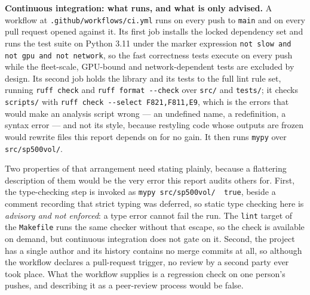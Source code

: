 \textbf{Continuous integration: what runs, and what is only advised.} A workflow
at \texttt{.github/workflows/ci.yml} runs on every push to \texttt{main} and on
every pull request opened against it. Its first job installs the locked
dependency set and runs the test suite on Python 3.11 under the marker
expression \texttt{not slow and not gpu and not network}, so the fast
correctness tests execute on every push while the fleet-scale, GPU-bound and
network-dependent tests are excluded by design. Its second job holds the library and its tests to the
full lint rule set, running \texttt{ruff check} and \texttt{ruff
format -{}-check} over \texttt{src/} and \texttt{tests/}; it checks
\texttt{scripts/} with \texttt{ruff check -{}-select F821,F811,E9}, which is
the errors that would make an analysis script wrong --- an undefined name, a
redefinition, a syntax error --- and not its style, because restyling code
whose outputs are frozen would rewrite files this report depends on for no
gain. It then runs \texttt{mypy} over
\texttt{src/sp500vol/}. %

Two properties of that arrangement need stating plainly, because a flattering
description of them would be the very error this report audits others for.
First, the type-checking step is invoked as
\texttt{mypy src/sp500vol/ \textbar\textbar\ true}, beside a comment recording
that strict typing was deferred, so static type checking here is \emph{advisory
and not enforced}: a type error cannot fail the run. The \texttt{lint} target of
the \texttt{Makefile} runs the same checker without that escape, so the check is
available on demand, but continuous integration does not gate on
it. %
Second, the project has a single author and its history contains no merge
commits at all, so although the workflow declares a pull-request trigger, no
review by a second party ever took place. What the workflow supplies is a
regression check on one person's pushes, and describing it as a peer-review
process would be false. %

